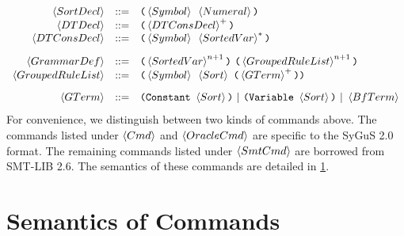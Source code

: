 \documentclass[english,a4paper,10pt]{article}
\begin{document}
\[\begin{array}{rcl}
 \sortdecl& ::= & \paren{\symbol\mbox{ }\intconst}\\
 \dtdecl & ::= & \paren{\kplus{\dtconsdecl}} \\
 \dtconsdecl & ::= & \paren{\symbol\mbox{ }\kstar{\sortedvar}} \\[2ex]
 \grammardef & ::= & \paren{\kstarn{\sortedvar}{n+1}}\mbox{ }\paren{\kstarn{\ntdef}{n+1}} \\
 \ntdef & ::= & \paren{\symbol\mbox{ }\sortexpr\mbox{ }\paren{ \kplus{\gterm} } } \\[2ex]
 \gterm 
 & ::= &  \paren{\constantkwd\mbox{ }\sortexpr}\mbox{ }|\mbox{ }\paren{\varkwd\mbox{ }\sortexpr}\mbox{ }|\mbox{ }\bfterm\\
\end{array}
\]
For convenience,
we distinguish between two kinds of commands above.
The commands listed under $\cmd$ and $\oraclecmd$ are specific to the SyGuS 2.0 format.
The remaining commands listed under $\smtcmd$
are borrowed from SMT-LIB 2.6.
The semantics of these commands are detailed in \cref{sec:semantics}.


\section{Semantics of Commands}%
\label{sec:semantics}
\end{document}
